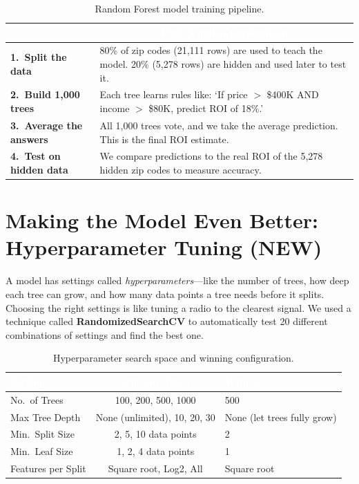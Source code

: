 \documentclass[12pt, a4paper]{article}
\newcommand{\hrow}{\rowcolor{rowblue}}
\begin{document}
\begin{table}[H]
\centering
\renewcommand{\arraystretch}{1.5}
\begin{tabularx}{\linewidth}{>{\bfseries}p{3cm} X}
\toprule
\rowcolor{headerblue}
\multicolumn{1}{c}{\textcolor{white}{\textbf{Step}}} &
\multicolumn{1}{c}{\textcolor{white}{\textbf{Plain English Explanation}}} \\
\midrule
1.\ Split the data    & 80\% of zip codes (21,111 rows) are used to teach the model. 20\% (5,278 rows) are hidden and used later to test it. \\
\hrow 2.\ Build 1,000 trees & Each tree learns rules like: `If price $>$ \$400K AND income $>$ \$80K, predict ROI of 18\%.' \\
3.\ Average the answers & All 1,000 trees vote, and we take the average prediction. This is the final ROI estimate. \\
\hrow 4.\ Test on hidden data & We compare predictions to the real ROI of the 5,278 hidden zip codes to measure accuracy. \\
\bottomrule
\end{tabularx}
\caption{Random Forest model training pipeline.}
\end{table}

\section{Making the Model Even Better: Hyperparameter Tuning (NEW)}

A model has settings called \textit{hyperparameters}---like the number of trees, how deep each tree can grow,
and how many data points a tree needs before it splits. Choosing the right settings is like tuning a radio to the
clearest signal. We used a technique called \textbf{RandomizedSearchCV} to automatically test 20 different
combinations of settings and find the best one.

\begin{table}[H]
\centering
\renewcommand{\arraystretch}{1.4}
\begin{tabular}{lcl}
\toprule
\rowcolor{headerblue}
\textcolor{white}{\textbf{Setting}} &
\textcolor{white}{\textbf{Options Tried}} &
\textcolor{white}{\textbf{Winner}} \\
\midrule
No.\ of Trees      & 100, 200, 500, 1000          & 500 \\
\hrow Max Tree Depth      & None (unlimited), 10, 20, 30 & None (let trees fully grow) \\
Min.\ Split Size   & 2, 5, 10 data points         & 2 \\
\hrow Min.\ Leaf Size     & 1, 2, 4 data points          & 1 \\
Features per Split & Square root, Log2, All       & Square root \\
\bottomrule
\end{tabular}
\caption{Hyperparameter search space and winning configuration.}
\end{table}
\end{document}
